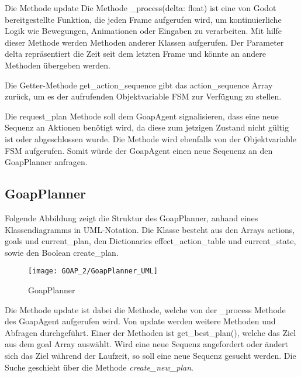 Die Methode update Die Methode \_process(delta: float) ist eine von Godot bereitgestellte Funktion, die jeden Frame aufgerufen wird, um kontinuierliche Logik wie Bewegungen, Animationen oder Eingaben zu verarbeiten. Mit hilfe dieser Methode werden Methoden anderer Klassen aufgerufen. Der Parameter delta repräsentiert die Zeit seit dem letzten Frame und könnte an andere Methoden übergeben werden.



Die Getter-Methode get\_action\_sequence gibt das action\_sequence Array zurück, um es der aufrufenden Objektvariable FSM zur Verfügung zu stellen.

Die request\_plan Methode soll dem GoapAgent signalisieren, dass eine neue Sequenz an Aktionen benötigt wird, da diese zum jetzigen Zustand nicht gültig ist oder abgeschlossen wurde. Die Methode wird ebenfalls von der Objektvariable FSM aufgerufen. Somit würde der GoapAgent einen neue Seqeuenz an den GoapPlanner anfragen.

\subsection{GoapPlanner}

Folgende Abbildung zeigt die Struktur des GoapPlanner, anhand eines Klassendiagramms in UML-Notation. Die Klasse besteht aus den Arrays actions, goals und current\_plan, den Dictionaries effect\_action\_table und current\_state, sowie den Boolean create\_plan.

\begin{figure}[h]
  \centering
  \texttt{[image: GOAP\_2/GoapPlanner\_UML]}
	\captionsetup{justification=justified, format=plain}
  \caption{GoapPlanner}
  \label{GoapPlanner}
\end{figure}

Die Methode update ist dabei die Methode, welche von der \_process Methode des GoapAgent aufgerufen wird. Von update werden weitere  Methoden und Abfragen durchgeführt. Einer der Methoden ist get\_best\_plan(), welche das Ziel aus dem goal Array auswählt. Wird eine neue Sequenz angefordert oder ändert sich das Ziel während der Laufzeit, so soll eine neue Sequenz gesucht werden. Die Suche geschieht über die Methode \textit{create\_new\_plan}.



